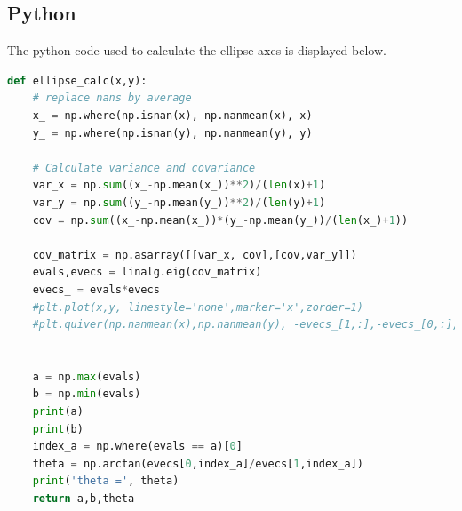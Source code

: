 \subsection{Python}
The python code used to calculate the ellipse axes is displayed below.
\begin{lstlisting}[language=Python]
def ellipse_calc(x,y):
    # replace nans by average
    x_ = np.where(np.isnan(x), np.nanmean(x), x)
    y_ = np.where(np.isnan(y), np.nanmean(y), y)

    # Calculate variance and covariance
    var_x = np.sum((x_-np.mean(x_))**2)/(len(x)+1)
    var_y = np.sum((y_-np.mean(y_))**2)/(len(y)+1)
    cov = np.sum((x_-np.mean(x_))*(y_-np.mean(y_))/(len(x_)+1))

    cov_matrix = np.asarray([[var_x, cov],[cov,var_y]])
    evals,evecs = linalg.eig(cov_matrix)
    evecs_ = evals*evecs
    #plt.plot(x,y, linestyle='none',marker='x',zorder=1)
    #plt.quiver(np.nanmean(x),np.nanmean(y), -evecs_[1,:],-evecs_[0,:],zorder=2, units='xy', scale=1, width=1e-8, headwidth=4)


    a = np.max(evals)
    b = np.min(evals)
    print(a)
    print(b)
    index_a = np.where(evals == a)[0]
    theta = np.arctan(evecs[0,index_a]/evecs[1,index_a])
    print('theta =', theta)
    return a,b,theta
\end{lstlisting}












